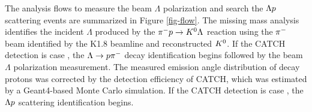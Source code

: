 
The analysis flows to measure the beam $\Lambda$ polarization and search the $\Lambda p$ scattering events are summarized in Figure \ref{fig-flow}. %
The missing mass analysis identifies the incident $\Lambda$ produced by the $\pi^- p \to K^0 \Lambda$ reaction using the $\pi^{-}$ beam identified by the K1.8 beamline and reconstructed $K^{0}$. If the CATCH detection is case , the $\Lambda\to p\pi^{-}$ decay identification begins followed by the beam $\Lambda$ polarization measurement. The measured emission angle distribution of decay protons was corrected by the detection efficiency of CATCH, which was estimated by a Geant4-based Monte Carlo simulation. If the CATCH detection is case , the $\Lambda p$ scattering identification begins. 

